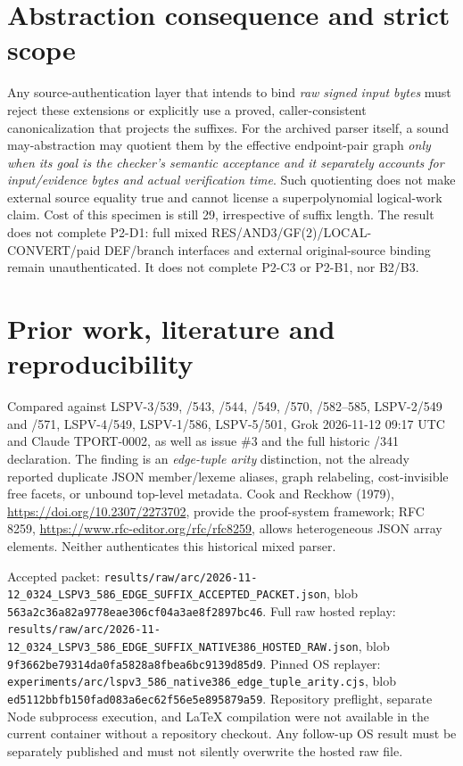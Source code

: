 \documentclass[11pt]{article}
\begin{document}
\section*{Abstraction consequence and strict scope}
Any source-authentication layer that intends to bind \emph{raw signed input bytes} must reject these extensions or explicitly use a proved, caller-consistent canonicalization that projects the suffixes. For the archived parser itself, a sound may-abstraction may quotient them by the effective endpoint-pair graph \emph{only when its goal is the checker's semantic acceptance and it separately accounts for input/evidence bytes and actual verification time}. Such quotienting does not make external source equality true and cannot license a superpolynomial logical-work claim. Cost of this specimen is still 29, irrespective of suffix length. The result does not complete P2-D1: full mixed RES/AND3/GF(2)/LOCAL-CONVERT/paid DEF/branch interfaces and external original-source binding remain unauthenticated. It does not complete P2-C3 or P2-B1, nor B2/B3.

\section*{Prior work, literature and reproducibility}
Compared against LSPV-3/539, /543, /544, /549, /570, /582--585, LSPV-2/549 and /571, LSPV-4/549, LSPV-1/586, LSPV-5/501, Grok 2026-11-12 09:17 UTC and Claude TPORT-0002, as well as issue \#3 and the full historic /341 declaration. The finding is an \emph{edge-tuple arity} distinction, not the already reported duplicate JSON member/lexeme aliases, graph relabeling, cost-invisible free facets, or unbound top-level metadata. Cook and Reckhow (1979), \url{https://doi.org/10.2307/2273702}, provide the proof-system framework; RFC 8259, \url{https://www.rfc-editor.org/rfc/rfc8259}, allows heterogeneous JSON array elements. Neither authenticates this historical mixed parser.

Accepted packet: \texttt{results/raw/arc/2026-11-12\_0324\_LSPV3\_586\_EDGE\_SUFFIX\_ACCEPTED\_PACKET.json}, blob \texttt{563a2c36a82a9778eae306cf04a3ae8f2897bc46}. Full raw hosted replay: \texttt{results/raw/arc/2026-11-12\_0324\_LSPV3\_586\_EDGE\_SUFFIX\_NATIVE386\_HOSTED\_RAW.json}, blob \texttt{9f3662be79314da0fa5828a8fbea6bc9139d85d9}. Pinned OS replayer: \texttt{experiments/arc/lspv3\_586\_native386\_edge\_tuple\_arity.cjs}, blob \texttt{ed5112bbfb150fad083a6ec62f56e5e895879a59}. Repository preflight, separate Node subprocess execution, and LaTeX compilation were not available in the current container without a repository checkout. Any follow-up OS result must be separately published and must not silently overwrite the hosted raw file.
\end{document}
